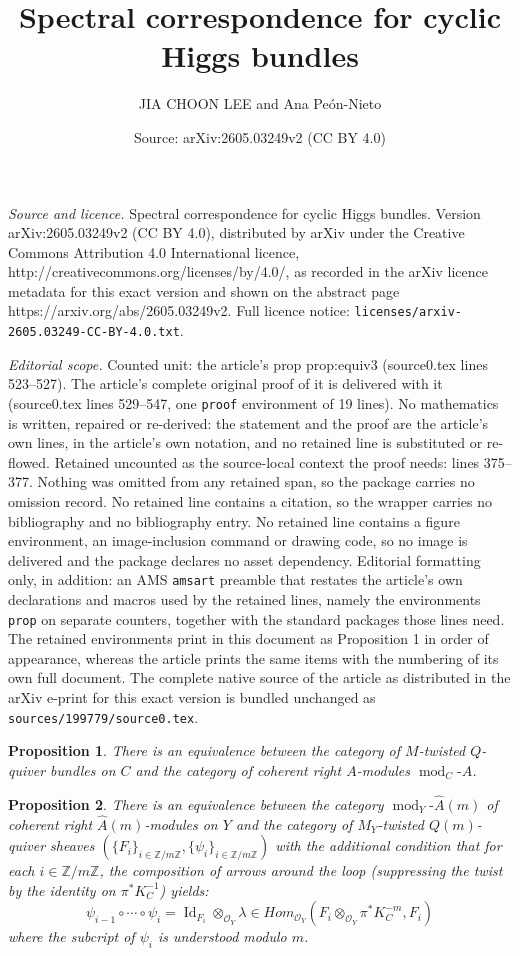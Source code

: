 \documentclass[10pt,a4paper]{amsart}
\title{Spectral correspondence for cyclic Higgs bundles}
\author{JIA CHOON LEE and Ana Pe\'on-Nieto}
\date{Source: arXiv:2605.03249v2 (CC BY 4.0)}
\newtheorem{prop}{Proposition}
\def\O{\mathcal{O}}
\def\mod{\operatorname{mod}}
\def\wAm{\widehat{A}(m)}
\def\zm{\mathbb{Z}/m\mathbb{Z}}
\begin{document}
\maketitle

\noindent\emph{Source and licence.} Spectral correspondence for cyclic Higgs bundles. Version arXiv:2605.03249v2 (CC BY 4.0), distributed by arXiv under the Creative Commons Attribution 4.0 International licence, http://creativecommons.org/licenses/by/4.0/, as recorded in the arXiv licence metadata for this exact version and shown on the abstract page https://arxiv.org/abs/2605.03249v2. Full licence notice: \texttt{licenses/arxiv-2605.03249-CC-BY-4.0.txt}.\par\smallskip

\noindent\textit{Editorial scope.} Counted unit: the article's prop prop:equiv3 (source0.tex lines 523--527). The article's complete original proof of it is delivered with it (source0.tex lines 529--547, one \texttt{proof} environment of 19 lines). No mathematics is written, repaired or re-derived: the statement and the proof are the article's own lines, in the article's own notation, and no retained line is substituted or re-flowed.  Retained uncounted as the source-local context the proof needs: lines 375--377.  Nothing was omitted from any retained span, so the package carries no omission record.  No retained line contains a citation, so the wrapper carries no bibliography and no bibliography entry.  No retained line contains a figure environment, an image-inclusion command or drawing code, so no image is delivered and the package declares no asset dependency.  Editorial formatting only, in addition: an AMS \texttt{amsart} preamble that restates the article's own declarations and macros used by the retained lines, namely the environments \texttt{prop} on separate counters, together with the standard packages those lines need.  The retained environments print in this document as Proposition 1 in order of appearance, whereas the article prints the same items with the numbering of its own full document.  The complete native source of the article as distributed in the arXiv e-print for this exact version is bundled unchanged as \texttt{sources/199779/source0.tex}.
\begin{prop}\label{prop:equiv1}
There is an equivalence between the category of $M$-twisted $Q$-quiver bundles on $C$ and the category of coherent right $A$-modules $\mod_C\!\text{-}A$.
\end{prop}

\begin{prop}\label{prop:equiv3}
There is an equivalence between the category $\mod_Y\!\text{-}\wAm$ of coherent right $\wAm$-modules on $Y$ and the category of $M_Y$-twisted $Q(m)$-quiver sheaves $(\{F_i\}_{i\in \zm}, \{\psi_i\}_{i\in \zm} )$ with the additional condition that for each $i\in \zm$, the composition of arrows around the loop (suppressing the twist by the identity on $\pi^*K_C^{-1}$) yields:
\[\psi_{i-1}\circ \cdots \circ \psi_i = \operatorname{Id}_{F_i}\otimes_{\O_Y} \lambda  \in Hom_{\O_Y}(F_i\otimes_{\O_Y} \pi^*K_C^{-m}, F_i )\]
where the subcript of $\psi_i$ is understood modulo $m$.
\end{prop}
\end{document}
